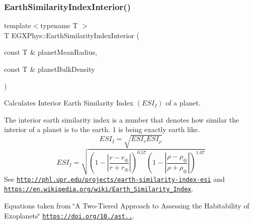 \subsubsection{\texorpdfstring{Earth\+Similarity\+Index\+Interior()}{EarthSimilarityIndexInterior()}}
{\footnotesize\ttfamily template$<$typename T $>$ \\
T E\+G\+X\+Phys\+::\+Earth\+Similarity\+Index\+Interior (\begin{DoxyParamCaption}\item[{const T \&}]{planet\+Mean\+Radius,  }\item[{const T \&}]{planet\+Bulk\+Density }\end{DoxyParamCaption})}



Calculates Interior Earth Similarity Index $(ESI_I)$ of a planet. 

The interior earth similarity index is a number that denotes how similar the interior of a planet is to the earth. 1 is being exactly earth like. \[ESI_I=\sqrt{ESI_r ESI_\rho}\] \[ESI_I=\sqrt{\left ( 1 - \left | \frac{r-r_\oplus}{r+r_\oplus} \right | \right )^{0.57} \left ( 1 - \left | \frac{\rho-\rho_\oplus}{\rho+\rho_\oplus} \right | \right )^{1.07}}\] See \href{http://phl.upr.edu/projects/earth-similarity-index-esi}{\tt http\+://phl.\+upr.\+edu/projects/earth-\/similarity-\/index-\/esi} and \href{https://en.wikipedia.org/wiki/Earth_Similarity_Index}{\tt https\+://en.\+wikipedia.\+org/wiki/\+Earth\+\_\+\+Similarity\+\_\+\+Index}.

Equations taken from \char`\"{}\+A Two-\/\+Tiered Approach to Assessing the Habitability of Exoplanets\char`\"{} \href{https://doi.org/10.1089/ast.2010.0592}{\tt https\+://doi.\+org/10./ast..}.


